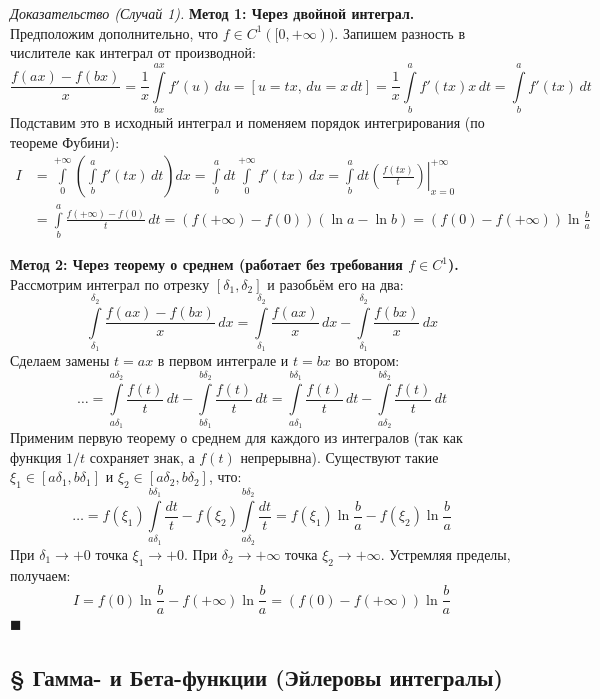\documentclass[12pt,a4paper]{article}
\newenvironment{Proof}[1][Доказательство]{\vspace{0.5em}\noindent\textit{#1.}\hspace{0.5em}\ignorespaces}{\hfill$\blacksquare$\vspace{1em}}
\begin{document}
\begin{Proof}[Доказательство (Случай 1)]
\textbf{Метод 1: Через двойной интеграл.} \\
Предположим дополнительно, что $f \in C^1([0, +\infty))$. Запишем разность в числителе как интеграл от производной:
$$ \frac{f(ax) - f(bx)}{x} = \frac{1}{x} \int\limits_{bx}^{ax} f'(u) \, du = \left[ u = tx, \, du = x \, dt \right] = \frac{1}{x} \int\limits_b^a f'(tx) x \, dt = \int\limits_b^a f'(tx) \, dt $$
Подставим это в исходный интеграл и поменяем порядок интегрирования (по теореме Фубини):
\begin{align*}
    I &= \int\limits_0^{+\infty} \left( \int\limits_b^a f'(tx) \, dt \right) dx = \int\limits_b^a dt \int\limits_0^{+\infty} f'(tx) \, dx = \int\limits_b^a dt \left. \left( \frac{f(tx)}{t} \right) \right|_{x=0}^{+\infty} \\
    &= \int\limits_b^a \frac{f(+\infty) - f(0)}{t} \, dt = (f(+\infty) - f(0)) (\ln a - \ln b) = (f(0) - f(+\infty)) \ln\frac{b}{a}
\end{align*}

\textbf{Метод 2: Через теорему о среднем (работает без требования $f \in C^1$).} \\
Рассмотрим интеграл по отрезку $[\delta_1, \delta_2]$ и разобьём его на два:
$$ \int\limits_{\delta_1}^{\delta_2} \frac{f(ax) - f(bx)}{x} \, dx = \int\limits_{\delta_1}^{\delta_2} \frac{f(ax)}{x} \, dx - \int\limits_{\delta_1}^{\delta_2} \frac{f(bx)}{x} \, dx $$
Сделаем замены $t = ax$ в первом интеграле и $t = bx$ во втором:
$$ \dots = \int\limits_{a\delta_1}^{a\delta_2} \frac{f(t)}{t} \, dt - \int\limits_{b\delta_1}^{b\delta_2} \frac{f(t)}{t} \, dt = \int\limits_{a\delta_1}^{b\delta_1} \frac{f(t)}{t} \, dt - \int\limits_{a\delta_2}^{b\delta_2} \frac{f(t)}{t} \, dt $$
Применим первую теорему о среднем для каждого из интегралов (так как функция $1/t$ сохраняет знак, а $f(t)$ непрерывна). Существуют такие $\xi_1 \in [a\delta_1, b\delta_1]$ и $\xi_2 \in [a\delta_2, b\delta_2]$, что:
$$ \dots = f(\xi_1) \int\limits_{a\delta_1}^{b\delta_1} \frac{dt}{t} - f(\xi_2) \int\limits_{a\delta_2}^{b\delta_2} \frac{dt}{t} = f(\xi_1) \ln\frac{b}{a} - f(\xi_2) \ln\frac{b}{a} $$
При $\delta_1 \to +0$ точка $\xi_1 \to +0$. При $\delta_2 \to +\infty$ точка $\xi_2 \to +\infty$.
Устремляя пределы, получаем:
$$ I = f(0) \ln\frac{b}{a} - f(+\infty) \ln\frac{b}{a} = (f(0) - f(+\infty)) \ln\frac{b}{a} $$
\end{Proof}


\subsection{§ Гамма- и Бета-функции (Эйлеровы интегралы)}
\end{document}
